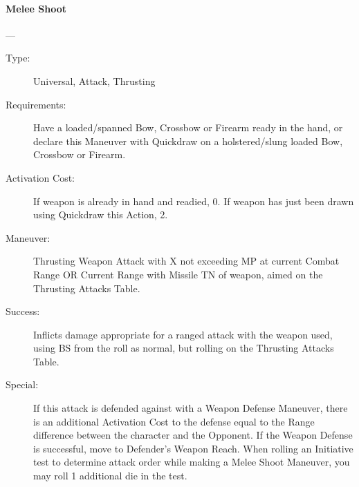 \documentclass[oneside,11pt,english]{book}
\begin{document}
\paragraph{\large\label{man:Melee Shoot}Melee Shoot}---\quad{\large[X+Variable]}
\vspace{-10pt}\begin{description}
\item [Type:] Universal, Attack, Thrusting 
\item [Requirements:] Have a loaded/spanned Bow, Crossbow or Firearm ready in the hand, or declare this 
Maneuver with Quickdraw on a holstered/slung loaded Bow, Crossbow or Firearm. 
\item [Activation Cost:] If weapon is already in hand and readied, 0. If weapon has just been drawn using 
Quickdraw this Action, 2. 
\item [Maneuver:] Thrusting Weapon Attack with X not exceeding MP at current Combat Range OR Current 
Range with Missile TN of weapon, aimed on the Thrusting Attacks Table. 
\item [Success:] Inflicts damage appropriate for a ranged attack with the weapon used, using BS from the roll as 
normal, but rolling on the Thrusting Attacks Table. 
\item [Special:] If this attack is defended against with a Weapon Defense Maneuver, there is an additional 
Activation Cost to the defense equal to the Range difference between the character and the Opponent. If 
the Weapon Defense is successful, move to Defender’s Weapon Reach. 
When rolling an Initiative test to determine attack order while making a Melee Shoot Maneuver, you may 
roll 1 additional die in the test. 
\end{description}
\end{document}
